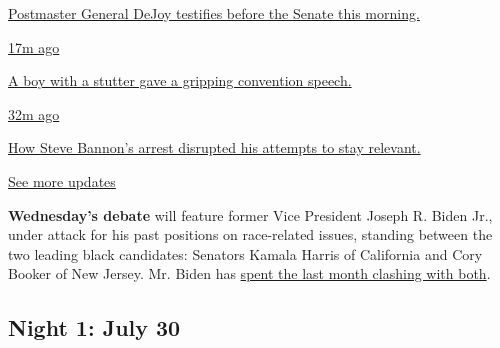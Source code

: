 \href{https://www.nytimes3xbfgragh.onion/live/2020/08/21/us/dnc-convention-election?action=click\&pgtype=Article\&state=default\&region=MAIN_CONTENT_1\&context=storylines_live_updates\#postmaster-general-dejoy-testifies-before-the-senate-this-morning}{Postmaster
General DeJoy testifies before the Senate this morning.}

\href{https://www.nytimes3xbfgragh.onion/live/2020/08/21/us/dnc-convention-election?action=click\&pgtype=Article\&state=default\&region=MAIN_CONTENT_1\&context=storylines_live_updates\#a-boy-with-a-stutter-gave-a-gripping-convention-speech}{17m
ago}

\href{https://www.nytimes3xbfgragh.onion/live/2020/08/21/us/dnc-convention-election?action=click\&pgtype=Article\&state=default\&region=MAIN_CONTENT_1\&context=storylines_live_updates\#a-boy-with-a-stutter-gave-a-gripping-convention-speech}{A
boy with a stutter gave a gripping convention speech.}

\href{https://www.nytimes3xbfgragh.onion/live/2020/08/21/us/dnc-convention-election?action=click\&pgtype=Article\&state=default\&region=MAIN_CONTENT_1\&context=storylines_live_updates\#how-steve-bannons-arrest-disrupted-his-attempts-to-stay-relevant}{32m
ago}

\href{https://www.nytimes3xbfgragh.onion/live/2020/08/21/us/dnc-convention-election?action=click\&pgtype=Article\&state=default\&region=MAIN_CONTENT_1\&context=storylines_live_updates\#how-steve-bannons-arrest-disrupted-his-attempts-to-stay-relevant}{How
Steve Bannon's arrest disrupted his attempts to stay relevant.}

\href{https://www.nytimes3xbfgragh.onion/live/2020/08/21/us/dnc-convention-election?action=click\&pgtype=Article\&state=default\&region=MAIN_CONTENT_1\&context=storylines_live_updates}{See
more updates}

\textbf{Wednesday's debate} will feature former Vice President Joseph R.
Biden Jr., under attack for his past positions on race-related issues,
standing between the two leading black candidates: Senators Kamala
Harris of California and Cory Booker of New Jersey. Mr. Biden has
\href{https://www.nytimes3xbfgragh.onion/2019/07/25/us/politics/biden-booker-black-voters.html}{spent
the last month clashing with both}.

\hypertarget{night-1-july-30}{%
\subsection{Night 1: July 30}\label{night-1-july-30}}

